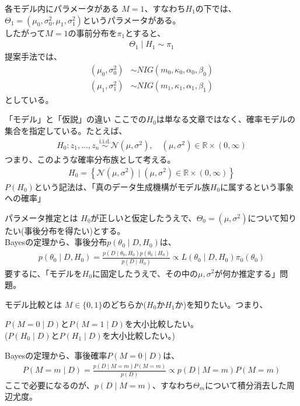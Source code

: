 \documentclass[dvipdfmx, 11pt, aspectratio=169, notheorems]{beamer}
\newcommand{\iid}{\stackrel{\mathrm{i.i.d.}}{\sim}}
\begin{document}
\begin{frame}{各モデル内にパラメータがある}
    $M=1$、すなわち$H_1$の下では、$\Theta_1=(\mu_0, \sigma_0^2, \mu_1, \sigma_1^2)$というパラメータがある。\\
    したがって$M=1$の事前分布を$\pi_1$とすると、
    \begin{align}
        \Theta_1 \mid H_1 \sim \pi_1
    \end{align}
    提案手法では、
    \begin{align}
        (\mu_0, \sigma_0^2) &\sim NIG(m_0, \kappa_0, \alpha_0, \beta_0) \\
        (\mu_1, \sigma_1^2) &\sim NIG(m_1, \kappa_1, \alpha_1, \beta_1)
    \end{align}
    としている。
\end{frame}

\begin{frame}{「モデル」と「仮説」の違い}
    ここでの$H_0$は単なる文章ではなく、確率モデルの集合を指定している。たとえば、
    \begin{align}
        H_0: z_1, \ldots, z_n \iid \mathcal{N}(\mu, \sigma^2), \quad (\mu, \sigma^2) \in \mathbb{R} \times (0, \infty)
    \end{align}
    つまり、このような確率分布族として考える。
    \begin{align}
        H_0 = \left\{ \mathcal{N}(\mu, \sigma^2) \mid (\mu, \sigma^2) \in \mathbb{R} \times (0, \infty) \right\}    
    \end{align}
    $P(H_0)$という記法は、「真のデータ生成機構がモデル族$H_0$に属するという事象への確率」
\end{frame}

\begin{frame}{パラメータ推定とは}
    $H_0$が正しいと仮定したうえで、$\Theta_0=(\mu, \sigma^2)$について知りたい(事後分布を得たい)とする。\\
    Bayesの定理から、事後分布$p(\theta_0 \mid D, H_0)$は、
    \begin{align}
        p(\theta_0 \mid D, H_0) = \frac{p(D\mid \theta_0, H_0)p(\theta_0\mid H_0)}{p(D\mid H_0)} \propto L(\theta_0\mid D, H_0)\pi_0(\theta_0)
    \end{align}
    要するに、「\alert{モデルを$H_0$に固定したうえで、その中の$\mu, \sigma^2$が何か推定する}」問題。
\end{frame}

\begin{frame}{モデル比較とは}
    $M\in\{0, 1\}$のどちらか($H_0$か$H_1$か)を知りたい。つまり、\\
    \begin{center}
        \alert{$P(M=0\mid D)$と$P(M=1\mid D)$を大小比較したい。}\\
        {\scriptsize (\alert{$P(H_0\mid D)$と$P(H_1\mid D)$を大小比較したい。})}
    \end{center}
    Bayesの定理から、事後確率$P(M=0\mid D)$は、
    \begin{align}
        P(M=m\mid D) = \frac{p(D\mid M=m)P(M=m)}{p(D)} \propto p(D\mid M=m)P(M=m)
    \end{align}
    ここで必要になるのが、$p(D\mid M=m)$、すなわち$\Theta_m$について積分消去した周辺尤度。
\end{frame}
\end{document}
